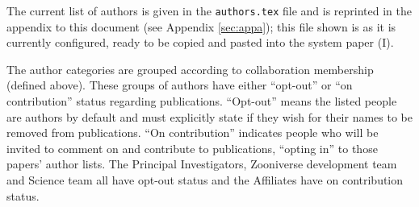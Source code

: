\documentclass[a4paper]{article}
\begin{document}
% 
% 
% 
% 
% 
The current list of \sw authors is given in the \texttt{authors.tex} file and
is reprinted in the appendix to this document (see Appendix \ref{sec:appa});
this file shown is as it is currently configured, ready to be copied and
pasted into the \sw system paper (\sw I). 

\noindent The author categories are grouped according to collaboration
membership (defined above). These groups of authors have either  ``opt-out''
or ``on contribution'' status regarding \sw publications.  ``Opt-out'' means
the listed people are authors by default and must explicitly state if they
wish for their names to be removed from \sw publications. ``On contribution''
indicates people who will be invited to comment on and contribute to
publications, ``opting in'' to those papers' author lists. The Principal
Investigators, Zooniverse development team and \sw Science team all have
opt-out status and the \sw Affiliates have on contribution status.
\end{document}
